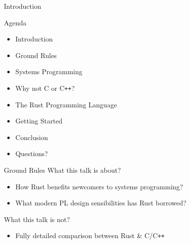 \begin{section}{Introduction}
  \begin{frame}{Agenda}
    \begin{itemize}
    \item Introduction
    \item Ground Rules
    \item Systems Programming
    \item Why not C or C\texttt{++}?
    \item The Rust Programming Language
    \item Getting Started
    \item Conclusion
    \item Questions?
    \end{itemize}
  \end{frame}

  \begin{frame}{Ground Rules}
    What this talk is about?
    \begin{itemize}
    \item How Rust benefits newcomers to systems programming?
    \item What modern PL design sensibilities has Rust borrowed?
    \end{itemize}

    What this talk is not?
    \begin{itemize}
    \item Fully detailed comparison between Rust \& C/C\texttt{++}
    \end{itemize}
  \end{frame}
\end{section}
